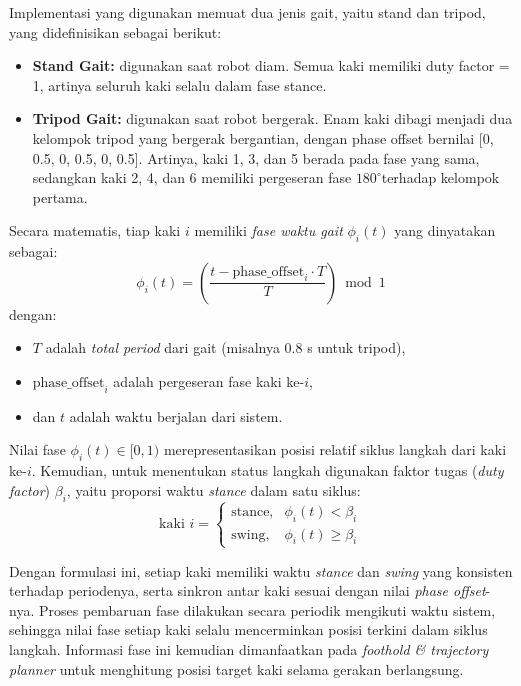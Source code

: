 Implementasi yang digunakan memuat dua jenis gait, yaitu stand dan tripod,
yang didefinisikan sebagai berikut:
\begin{itemize}
  \item \textbf{Stand Gait:} digunakan saat robot diam. Semua kaki memiliki
  duty factor = 1, artinya seluruh kaki selalu dalam fase stance.
  \item \textbf{Tripod Gait:} digunakan saat robot bergerak. Enam kaki dibagi
  menjadi dua kelompok tripod yang bergerak bergantian, dengan phase offset
  bernilai [0, 0.5, 0, 0.5, 0, 0.5]. Artinya, kaki 1, 3, dan 5 berada pada fase
  yang sama, sedangkan kaki 2, 4, dan 6 memiliki pergeseran fase \(180^\circ
  \)terhadap kelompok pertama.
\end{itemize} 
Secara matematis, tiap kaki $i$ memiliki \textit{fase waktu gait} $\phi_i(t)$ yang dinyatakan sebagai:
\begin{equation}
\phi_i(t) = \left( \frac{t - \text{phase\_offset}_i \cdot T}{T} \right) \bmod 1
\end{equation}
dengan:
\begin{itemize}
    \item $T$ adalah \textit{total period} dari gait (misalnya 0.8 s untuk tripod),
    \item $\text{phase\_offset}_i$ adalah pergeseran fase kaki ke-$i$,
    \item dan $t$ adalah waktu berjalan dari sistem.
\end{itemize}

Nilai fase $\phi_i(t) \in [0, 1)$ merepresentasikan posisi relatif siklus langkah dari kaki ke-$i$. 
Kemudian, untuk menentukan status langkah digunakan faktor tugas (\textit{duty factor}) $\beta_i$, yaitu proporsi waktu \textit{stance} dalam satu siklus:
\begin{equation}
\text{kaki } i =
\begin{cases}
\text{stance}, & \phi_i(t) < \beta_i \\
\text{swing}, & \phi_i(t) \geq \beta_i
\end{cases}
\end{equation}

Dengan formulasi ini, setiap kaki memiliki waktu \textit{stance} dan
\textit{swing} yang konsisten terhadap periodenya, serta sinkron antar kaki
sesuai dengan nilai \textit{phase offset}-nya. Proses pembaruan fase dilakukan
secara periodik mengikuti waktu sistem, sehingga nilai fase setiap kaki selalu
mencerminkan posisi terkini dalam siklus langkah. Informasi fase ini kemudian
dimanfaatkan pada \emph{foothold \& trajectory planner} untuk menghitung posisi
target kaki selama gerakan berlangsung.

